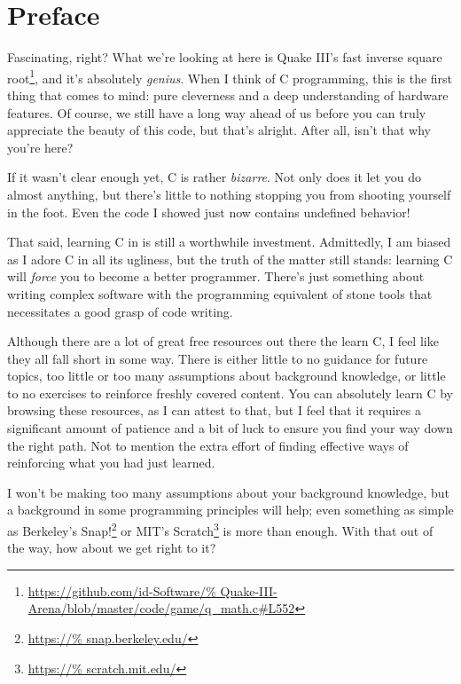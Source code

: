 %

\chapter{Preface}


\noindent
Fascinating, right?  What we're looking at here is Quake III's fast
inverse square root\footnote{\url{https://github.com/id-Software/%
Quake-III-Arena/blob/master/code/game/q_math.c\#L552}}, and it's
absolutely \emph{genius}.  When I think of C programming, this is the
first thing that comes to mind: pure cleverness and a deep understanding
of hardware features.  Of course, we still have a long way ahead of us
before you can truly appreciate the beauty of this code, but that's
alright.  After all, isn't that why you're here?

If it wasn't clear enough yet, C is rather \emph{bizarre}.  Not only
does it let you do almost anything, but there's little to nothing
stopping you from shooting yourself in the foot.  Even the code I showed
just now contains undefined behavior!

That said, learning C in  is still a
worthwhile investment.  Admittedly, I am biased as I adore C in all its
ugliness, but the truth of the matter still stands: learning C will
\emph{force} you to become a better programmer.  There's just something
about writing complex software with the programming equivalent of stone
tools that necessitates a good grasp of code writing.

Although there are a lot of great free resources out there the learn C,
I feel like they all fall short in some way.  There is either little to
no guidance for future topics, too little or too many assumptions about
background knowledge, or little to no exercises to reinforce freshly
covered content.  You can absolutely learn C by browsing these
resources, as I can attest to that, but I feel that it requires a
significant amount of patience and a bit of luck to ensure you find your
way down the right path.  Not to mention the extra effort of finding
effective ways of reinforcing what you had just learned.

I won't be making too many assumptions about your background knowledge,
but a background in some programming principles will help; even
something as simple as Berkeley's Snap!\footnote{\url{https://%
snap.berkeley.edu/}} or MIT's Scratch\footnote{\url{https://%
scratch.mit.edu/}} is more than enough.  With that out of the way, how
about we get right to it?

